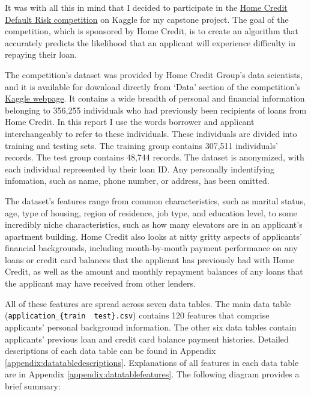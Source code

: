 \documentclass[12pt, letterpaper]{article}
\begin{document}
It was with all this in mind that I decided to participate in the \href{https://www.kaggle.com/c/home-credit-default-risk}{Home Credit Default Risk competition} on Kaggle\cite{kagglehomecreditcompetitionoverview} for my capstone project. The goal of the competition, which is sponsored by Home Credit, is to create an algorithm that accurately predicts the likelihood that an applicant will experience difficulty in repaying their loan.

The competition's dataset was provided by Home Credit Group's data scientists, and it is available for download directly from `Data' section of the competition's \href{https://www.kaggle.com/c/home-credit-default-risk/data}{Kaggle webpage}\cite{kagglehomecreditcompetitiondata}. It contains a wide breadth of personal and financial information belonging to 356,255 individuals who had previously been recipients of loans from Home Credit. In this report I use the words borrower and applicant interchangeably to refer to these individuals. These individuals are divided into training and testing sets. The training group contains 307,511 individuals' records. The test group contains 48,744 records. The dataset is anonymized, with each individual represented by their loan ID. Any personally indentifying infomation, such as name, phone number, or address, has been omitted.

The dataset's features range from common characteristics, such as marital status, age, type of housing, region of residence, job type, and education level, to some incredibly niche characteristics, such as how many elevators are in an applicant's apartment building. Home Credit also looks at nitty gritty aspects of applicants' financial backgrounds, including month-by-month payment performance on any loans or credit card balances that the applicant has previously had with Home Credit, as well as the amount and monthly repayment balances of any loans that the applicant may have received from other lenders.

All of these features are spread across seven data tables. The main data table (\colorbox{backcolor}{\textcolor{black}{\texttt{application_\{train \textbar~test\}.csv}}}) contains 120 features that comprise applicants' personal background information. The other six data tables contain applicants' previous loan and credit card balance payment histories. Detailed descriptions of each data table can be found in Appendix \ref{appendix:datatabledescriptions}. Explanations of all features in each data table are in Appendix \ref{appendix:datatablefeatures}. The following diagram provides a brief summary:
\end{document}
